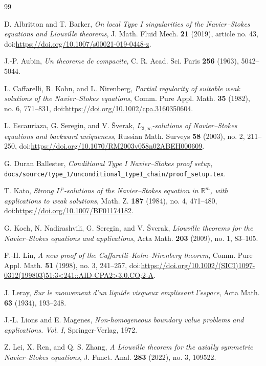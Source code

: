 \documentclass[11pt]{amsart}
\theoremstyle{plain}
\theoremstyle{definition}
\theoremstyle{remark}
\numberwithin{equation}{section}
\begin{document}
\begin{thebibliography}{99}

D. Albritton and T. Barker,
\emph{On local Type I singularities of the Navier--Stokes equations and
Liouville theorems},
J. Math. Fluid Mech. \textbf{21} (2019), article no. 43,
doi:\url{https://doi.org/10.1007/s00021-019-0448-z}.

J.-P. Aubin,
\emph{Un theoreme de compacite},
C. R. Acad. Sci. Paris \textbf{256} (1963), 5042--5044.

L. Caffarelli, R. Kohn, and L. Nirenberg,
\emph{Partial regularity of suitable weak solutions of the Navier--Stokes equations},
Comm. Pure Appl. Math. \textbf{35} (1982), no. 6, 771--831,
doi:\url{https://doi.org/10.1002/cpa.3160350604}.

L. Escauriaza, G. Seregin, and V. \v{S}verak,
\emph{\(L_{3,\infty}\)-solutions of Navier--Stokes equations and backward uniqueness},
Russian Math. Surveys \textbf{58} (2003), no. 2, 211--250,
doi:\url{https://doi.org/10.1070/RM2003v058n02ABEH000609}.

G. Duran Ballester,
\emph{Conditional Type I Navier--Stokes proof setup},
\texttt{docs/source/type\_1/unconditional\_typeI\_chain/proof\_setup.tex}.

T. Kato,
\emph{Strong \(L^p\)-solutions of the Navier--Stokes equation in
\(\mathbb R^m\), with applications to weak solutions},
Math. Z. \textbf{187} (1984), no. 4, 471--480,
doi:\url{https://doi.org/10.1007/BF01174182}.

G. Koch, N. Nadirashvili, G. Seregin, and V. \v{S}verak,
\emph{Liouville theorems for the Navier--Stokes equations and applications},
Acta Math. \textbf{203} (2009), no. 1, 83--105.

F.-H. Lin,
\emph{A new proof of the Caffarelli--Kohn--Nirenberg theorem},
Comm. Pure Appl. Math. \textbf{51} (1998), no. 3, 241--257,
doi:\url{https://doi.org/10.1002/(SICI)1097-0312(199803)51:3<241::AID-CPA2>3.0.CO;2-A}.

J. Leray,
\emph{Sur le mouvement d'un liquide visqueux emplissant l'espace},
Acta Math. \textbf{63} (1934), 193--248.

J.-L. Lions and E. Magenes,
\emph{Non-homogeneous boundary value problems and applications. Vol. I},
Springer-Verlag, 1972.

Z. Lei, X. Ren, and Q. S. Zhang,
\emph{A Liouville theorem for the axially symmetric Navier--Stokes equations},
J. Funct. Anal. \textbf{283} (2022), no. 3, 109522.


\end{thebibliography}
\end{document}
